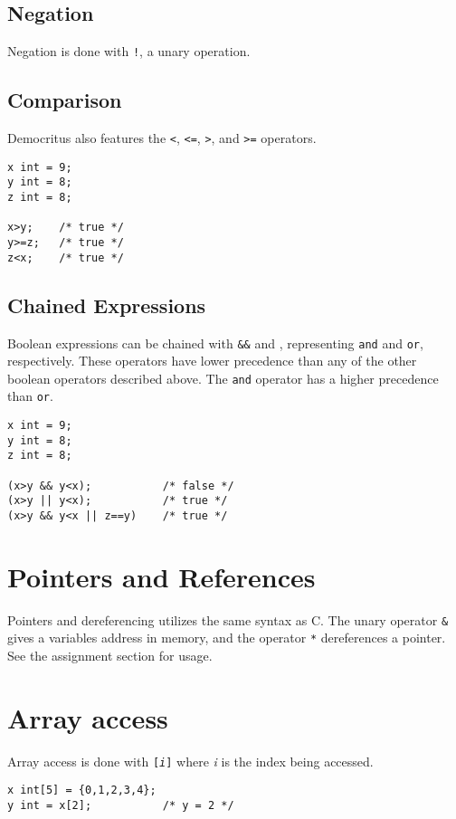 		\subsection{Negation}
			Negation is done with \texttt{!}, a unary operation.

        \subsection{Comparison}
            Democritus also features the \texttt{\textless}, \texttt{\textless =}, \texttt{\textgreater}, and \texttt{\textgreater =} operators.  
            
            \begin{lstlisting}
x int = 9;
y int = 8;
z int = 8;

x>y;    /* true */
y>=z;   /* true */
z<x;    /* true */
            \end{lstlisting}

        \subsection{Chained Expressions}
            Boolean expressions can be chained with \texttt{\&\&} and \texttt{\textbar\textbar}, representing \texttt{and} and \texttt{or}, respectively. These operators have lower precedence than any of the other boolean operators described above. The \texttt{and} operator has a higher precedence than \texttt{or}.

            \begin{lstlisting}
x int = 9;
y int = 8;
z int = 8;

(x>y && y<x);    		/* false */
(x>y || y<x);  	 		/* true */
(x>y && y<x || z==y)    /* true */
            \end{lstlisting}
            
	\section{Pointers and References}
		Pointers and dereferencing utilizes the same syntax as C. The unary operator \texttt{\&} gives a variables address in memory, and the operator \texttt{*} dereferences a pointer. See the assignment section for usage.
		
	\section{Array access}
		Array access is done with \texttt{[\textit{i}]} where \textit{i} is the index being accessed. 
		
		\begin{lstlisting}
x int[5] = {0,1,2,3,4};
y int = x[2];  			/* y = 2 */
		\end{lstlisting}
		
